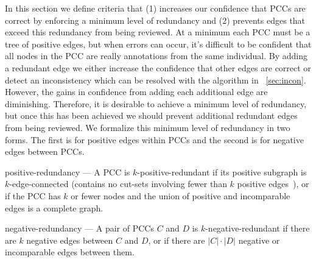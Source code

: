In this section we define criteria that
(1) increases our confidence that PCCs are correct by enforcing a minimum level of redundancy and
(2) prevents edges that exceed this redundancy from being reviewed.
At a minimum each PCC must be a tree of positive edges, but when errors can occur, it's difficult to be confident
  that all nodes in the PCC are really annotations from the same individual.
By adding a redundant edge we either increase the confidence that other edges are correct or detect an
  inconsistency which can be resolved with the algorithm in ~\cref{sec:incon}.
However, the gains in confidence from adding each additional edge are diminishing.
Therefore, it is desirable to achieve a minimum level of redundancy, but once this has been achieved we should
  prevent additional redundant edges from being reviewed.
We formalize this minimum level of redundancy in two forms.
The first is for positive edges within PCCs and the second is for negative edges between PCCs.
\begin{enumln}

    \item positive-redundancy --- %
        A PCC is $k$-positive-redundant if its positive subgraph is $k$-edge-connected (contains no cut-sets
          involving fewer than $k$ positive edges~\cite{eswaran_augmentation_1976}), or if the PCC has $k$ or fewer
          nodes and the union of positive and incomparable edges is a complete graph.

    \item negative-redundancy --- %
        A pair of PCCs $C$ and $D$ is $k$-negative-redundant if there are $k$ negative edges between $C$ and $D$,
          or if there are $|C| \cdot |D|$ negative or incomparable edges between them.
        

\end{enumln}
\kredun{}

